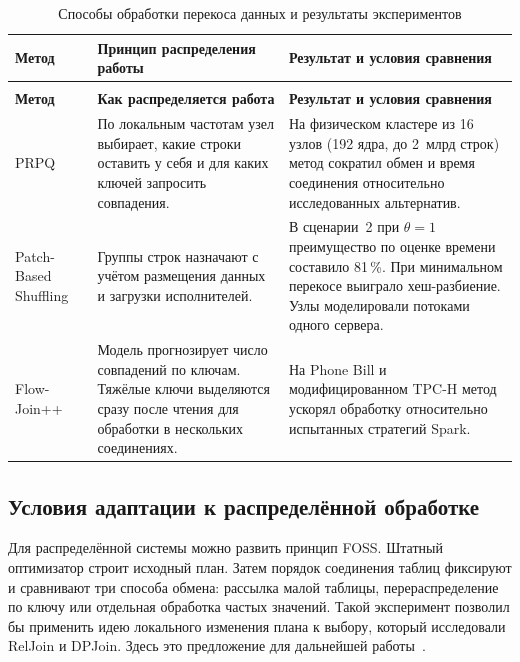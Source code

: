 \documentclass[a4paper, final]{article}
\renewcommand{\arraystretch}{1.4} %
\begin{document}
	\begingroup
	\small
	\setlength{\tabcolsep}{4pt}
	\renewcommand{\arraystretch}{1.15}
	\begin{longtable}{@{}>{\raggedright\arraybackslash}p{.20\linewidth}>{\raggedright\arraybackslash}p{.34\linewidth}>{\raggedright\arraybackslash}p{}@{}}
		\caption{Способы обработки перекоса данных и результаты экспериментов}\label{tab:skew-methods}\\
		\toprule
		\textbf{Метод} & \textbf{Принцип распределения работы} & \textbf{Результат и условия сравнения}\\
		\midrule
		\endfirsthead
		\multicolumn{3}{l}{Продолжение таблицы~\ref{tab:skew-methods}}\\
		\toprule
		\textbf{Метод} & \textbf{Как распределяется работа} & \textbf{Результат и условия сравнения}\\
		\midrule
		\endhead
		\bottomrule
		\endfoot
		PRPQ~\cite{prpq2017} & По локальным частотам узел выбирает, какие строки оставить у себя и для каких ключей запросить совпадения. & На физическом кластере из 16 узлов (192 ядра, до 2~млрд строк) метод сократил обмен и время соединения относительно исследованных альтернатив. \\[2pt]
		Patch-Based Shuffling~\cite{kassela2025} & Группы строк назначают с учётом размещения данных и загрузки исполнителей. & В сценарии~2 при $\theta=1$ преимущество по оценке времени составило 81\,\%. При минимальном перекосе выиграло хеш-разбиение. Узлы моделировали потоками одного сервера. \\[2pt]
		Flow-Join++~\cite{flowjoin2026} & Модель прогнозирует число совпадений по ключам. Тяжёлые ключи выделяются сразу после чтения для обработки в нескольких соединениях. & На Phone Bill и модифицированном TPC-H метод ускорял обработку относительно испытанных стратегий Spark.  \\[2pt]
	\end{longtable}
	\endgroup
	
	\subsection{Условия адаптации к распределённой обработке}
	
	Для распределённой системы можно развить принцип FOSS. Штатный оптимизатор строит исходный план. Затем порядок соединения таблиц фиксируют и сравнивают три способа обмена: рассылка малой таблицы, перераспределение по ключу или отдельная обработка частых значений. Такой эксперимент позволил бы применить идею локального изменения плана к выбору, который исследовали RelJoin и DPJoin. Здесь это предложение для дальнейшей работы~\cite{foss2024,liang2024,turkmen2026}.
	
\end{document}

